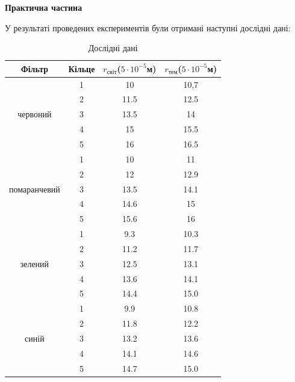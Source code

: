 \begin{center}
    \Large{\textbf{Практична частина}}
\end{center}

\vspace{1mm}

У результаті проведених експериментів 
були отримані наступні дослідні дані:

\begin{table}[h]
    \centering
    \begin{tabular}{|c|c|c|c|}
        \hline
        \textbf{Фільтр} & \textbf{Кільце} & \textbf{$r_{світ}$($5 \cdot 10^{-5}$м)} & \textbf{$r_{тем}$($5 \cdot 10^{-5}$м)} \\

        \hline
        \multirow{5}{*}{червоний} & 1 & 10 & 10,7 \\
        \cline{2-4}
        & 2 & 11.5 & 12.5 \\
        \cline{2-4}
        & 3 & 13.5 & 14 \\
        \cline{2-4}
        & 4 & 15 & 15.5 \\
        \cline{2-4}
        & 5 & 16 & 16.5 \\
        \hline
        
        \hline
        \multirow{5}{*}{помаранчевий} & 1 & 10 & 11 \\
        \cline{2-4}
        & 2 & 12 & 12.9  \\
        \cline{2-4}
        & 3 & 13.5 & 14.1 \\
        \cline{2-4}
        & 4 & 14.6 & 15  \\
        \cline{2-4}
        & 5 & 15.6 & 16  \\ 
        \hline

        \hline
        \multirow{5}{*}{зелений} & 1 & 9.3 & 10.3 \\
        \cline{2-4}
        & 2 & 11.2 & 11.7 \\
        \cline{2-4}
        & 3 & 12.5 & 13.1 \\
        \cline{2-4}
        & 4 & 13.6 & 14.1 \\
        \cline{2-4}
        & 5 & 14.4 & 15.0 \\
        \hline

        \hline
        \multirow{5}{*}{синій} & 1 & 9.9 & 10.8 \\
        \cline{2-4}        
        & 2 & 11.8 & 12.2 \\
        \cline{2-4}
        & 3 & 13.2 & 13.6 \\
        \cline{2-4}
        & 4 & 14.1 & 14.6 \\
        \cline{2-4}
        & 5 & 14.7 & 15.0 \\
        \hline

    \end{tabular}
    \caption{Дослідні дані}
\end{table}

